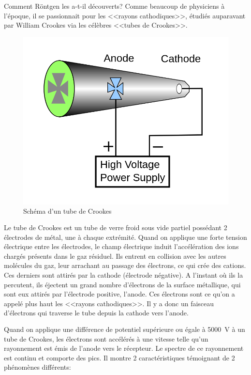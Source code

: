 Comment Röntgen les a-t-il découverts? Comme beaucoup de physiciens à l'époque, il se passionnait pour les <<rayons cathodiques>>, étudiés auparavant par William Crookes via les célèbres <<tubes de Crookes>>.

\begin{figure}[ht]
    \centering
    \includegraphics[scale=0.20]{Images1/tubecrookes.png}
    \caption{Schéma d'un tube de Crookes}
\end{figure}

Le tube de Crookes est un tube de verre froid sous vide partiel possédant 2 électrodes de métal, une à chaque extrémité. Quand on applique une forte tension électrique entre les électrodes, le champ électrique induit l'accélération des ions chargés présents dans le gaz résiduel. Ils entrent en collision avec les autres molécules du gaz, leur arrachant au passage des électrons, ce qui crée des cations. Ces derniers sont attirés par la cathode (électrode négative). A l'instant où ils la percutent, ils éjectent un grand nombre d'électrons de la surface métallique, qui sont eux attirés par l'électrode positive, l'anode. Ces électrons sont ce qu'on a appelé plus haut les <<rayons cathodiques>>. Il y a donc un faisceau d'électrons qui traverse le tube depuis la cathode vers l'anode.

Quand on applique une différence de potentiel supérieure ou égale à \SI{5 000}{V} à un tube de Crookes, les électrons sont accélérés à une vitesse telle qu'un rayonnement est émis de l'anode vers le récepteur. Le spectre de ce rayonnement est continu et comporte des pics. Il montre 2 caractéristiques témoignant de 2 phénomènes différents:

